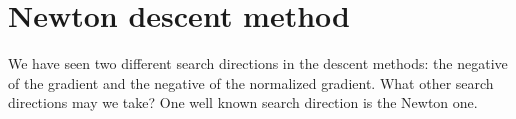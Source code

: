 \section{Newton descent method}
    We have seen two different search directions in the descent methods: the negative of the gradient and the negative of the normalized gradient. What other search directions may we take? One well known search direction is the Newton one.
